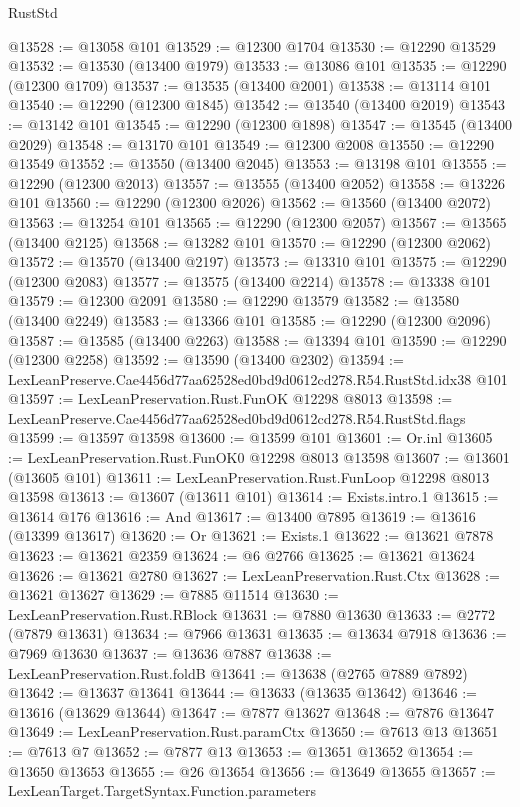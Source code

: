 \begin{lexlean}{RustStd}
\begin{coremodule}
@13528 := @13058 @101
@13529 := @12300 @1704
@13530 := @12290 @13529
@13532 := @13530 (@13400 @1979)
@13533 := @13086 @101
@13535 := @12290 (@12300 @1709)
@13537 := @13535 (@13400 @2001)
@13538 := @13114 @101
@13540 := @12290 (@12300 @1845)
@13542 := @13540 (@13400 @2019)
@13543 := @13142 @101
@13545 := @12290 (@12300 @1898)
@13547 := @13545 (@13400 @2029)
@13548 := @13170 @101
@13549 := @12300 @2008
@13550 := @12290 @13549
@13552 := @13550 (@13400 @2045)
@13553 := @13198 @101
@13555 := @12290 (@12300 @2013)
@13557 := @13555 (@13400 @2052)
@13558 := @13226 @101
@13560 := @12290 (@12300 @2026)
@13562 := @13560 (@13400 @2072)
@13563 := @13254 @101
@13565 := @12290 (@12300 @2057)
@13567 := @13565 (@13400 @2125)
@13568 := @13282 @101
@13570 := @12290 (@12300 @2062)
@13572 := @13570 (@13400 @2197)
@13573 := @13310 @101
@13575 := @12290 (@12300 @2083)
@13577 := @13575 (@13400 @2214)
@13578 := @13338 @101
@13579 := @12300 @2091
@13580 := @12290 @13579
@13582 := @13580 (@13400 @2249)
@13583 := @13366 @101
@13585 := @12290 (@12300 @2096)
@13587 := @13585 (@13400 @2263)
@13588 := @13394 @101
@13590 := @12290 (@12300 @2258)
@13592 := @13590 (@13400 @2302)
@13594 := LexLeanPreserve.Cae4456d77aa62528ed0bd9d0612cd278.R54.RustStd.idx38 @101
@13597 := LexLeanPreservation.Rust.FunOK @12298 @8013
@13598 := LexLeanPreserve.Cae4456d77aa62528ed0bd9d0612cd278.R54.RustStd.flags
@13599 := @13597 @13598
@13600 := @13599 @101
@13601 := Or.inl
@13605 := LexLeanPreservation.Rust.FunOK0 @12298 @8013 @13598
@13607 := @13601 (@13605 @101)
@13611 := LexLeanPreservation.Rust.FunLoop @12298 @8013 @13598
@13613 := @13607 (@13611 @101)
@13614 := Exists.intro.{1}
@13615 := @13614 @176
@13616 := And
@13617 := @13400 @7895
@13619 := @13616 (@13399 @13617)
@13620 := Or
@13621 := Exists.{1}
@13622 := @13621 @7878
@13623 := @13621 @2359
@13624 := @6 @2766
@13625 := @13621 @13624
@13626 := @13621 @2780
@13627 := LexLeanPreservation.Rust.Ctx
@13628 := @13621 @13627
@13629 := @7885 @11514
@13630 := LexLeanPreservation.Rust.RBlock
@13631 := @7880 @13630
@13633 := @2772 (@7879 @13631)
@13634 := @7966 @13631
@13635 := @13634 @7918
@13636 := @7969 @13630
@13637 := @13636 @7887
@13638 := LexLeanPreservation.Rust.foldB
@13641 := @13638 (@2765 @7889 @7892)
@13642 := @13637 @13641
@13644 := @13633 (@13635 @13642)
@13646 := @13616 (@13629 @13644)
@13647 := @7877 @13627
@13648 := @7876 @13647
@13649 := LexLeanPreservation.Rust.paramCtx
@13650 := @7613 @13
@13651 := @7613 @7
@13652 := @7877 @13
@13653 := @13651 @13652
@13654 := @13650 @13653
@13655 := @26 @13654
@13656 := @13649 @13655
@13657 := LexLeanTarget.TargetSyntax.Function.parameters

\end{coremodule}
\end{lexlean}
